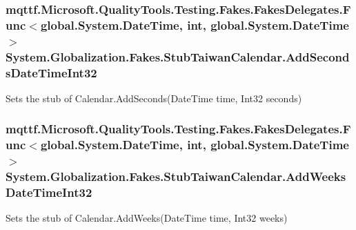 \hypertarget{class_system_1_1_globalization_1_1_fakes_1_1_stub_taiwan_calendar_a156074c458e66b884cca990892c79814}{
\subsubsection[{Add\-Seconds\-Date\-Time\-Int32}]{\setlength{\rightskip}{0pt plus 5cm}mqttf.\-Microsoft.\-Quality\-Tools.\-Testing.\-Fakes.\-Fakes\-Delegates.\-Func$<$global.\-System.\-Date\-Time, int, global.\-System.\-Date\-Time$>$ System.\-Globalization.\-Fakes.\-Stub\-Taiwan\-Calendar.\-Add\-Seconds\-Date\-Time\-Int32}}\label{class_system_1_1_globalization_1_1_fakes_1_1_stub_taiwan_calendar_a156074c458e66b884cca990892c79814}


Sets the stub of Calendar.\-Add\-Seconds(\-Date\-Time time, Int32 seconds)

\hypertarget{class_system_1_1_globalization_1_1_fakes_1_1_stub_taiwan_calendar_a03a792d7bc48b05b7c6914d48359085f}{
\subsubsection[{Add\-Weeks\-Date\-Time\-Int32}]{\setlength{\rightskip}{0pt plus 5cm}mqttf.\-Microsoft.\-Quality\-Tools.\-Testing.\-Fakes.\-Fakes\-Delegates.\-Func$<$global.\-System.\-Date\-Time, int, global.\-System.\-Date\-Time$>$ System.\-Globalization.\-Fakes.\-Stub\-Taiwan\-Calendar.\-Add\-Weeks\-Date\-Time\-Int32}}\label{class_system_1_1_globalization_1_1_fakes_1_1_stub_taiwan_calendar_a03a792d7bc48b05b7c6914d48359085f}


Sets the stub of Calendar.\-Add\-Weeks(\-Date\-Time time, Int32 weeks)

